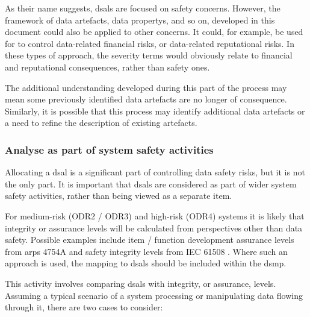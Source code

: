 As their name suggests, \glspl{dsal} are focused on safety concerns. However, the framework of \glspl{data artefact}, \glspl{data property}, and so on, developed in this document could also be applied to other concerns. It could, for example, be used for to control data-related financial risks, or data-related reputational risks. In these types of approach, the severity terms would obviously relate to financial and reputational consequences, rather than safety ones.

The additional understanding developed during this part of the process may mean some previously identified \glspl{data artefact} are no longer of consequence. Similarly, it is possible that this process may identify additional \glspl{data artefact} or a need to refine the description of existing artefacts.

\subsubsection{Analyse  as part of system safety activities}
\label{bkm:activities:analyse:partofsystemsafetyactivities}
Allocating a \gls{dsal} is a significant part of controlling data safety risks, but it is not the only part. It is important that \glspl{dsal} are considered as part of wider system safety activities, rather than being viewed as a separate item.

For medium-risk (ODR2 / ODR3) and high-risk (ODR4) systems it is likely that \gls{integrity} or assurance levels will be calculated from perspectives other than data safety. Possible examples include item / function development assurance levels from \glspl{arp} 4754A \cite{citation:arp4754a2010guidelines} and safety \gls{integrity} levels from IEC 61508 \cite{citation:iec615083}.
Where such an approach is used, the mapping to \glspl{dsal} should be included within the \gls{dsmp}.

This activity involves comparing \glspl{dsal} with \gls{integrity}, or assurance, levels. Assuming a typical scenario of a system processing or manipulating data flowing through it, there are two cases to consider:

